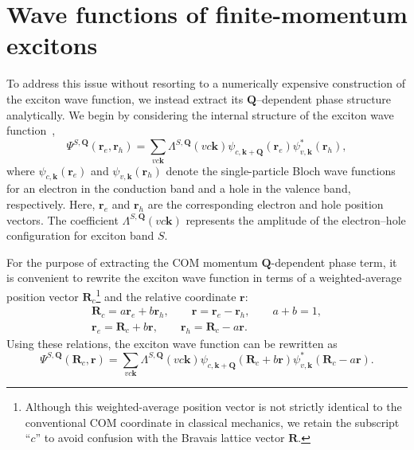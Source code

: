 %
%
%
%
%
%
\section{Wave functions of finite-momentum excitons}

To address this issue without resorting to a numerically expensive construction of the exciton wave function, we instead extract its $\boldsymbol{Q}$--dependent phase structure analytically. We begin by considering the internal structure of the exciton wave function~\cite{bajaj2025symmetries, haber2023maximally},
\begin{equation}
\Psi^{S,\boldsymbol{Q}}
(\boldsymbol{r}_e,\boldsymbol{r}_h)
=
\sum_{vc\boldsymbol{k}}
\Lambda^{S,\boldsymbol{Q}}(vc\boldsymbol{k})
\psi_{c,\boldsymbol{k}+\boldsymbol{Q}}(\boldsymbol{r}_e)
\psi^{*}_{v,\boldsymbol{k}}(\boldsymbol{r}_h),
\label{excitonWF1}
\end{equation}
where $\psi_{c,\boldsymbol{k}}(\boldsymbol{r}_e)$ and $\psi_{v,\boldsymbol{k}}(\boldsymbol{r}_h)$ denote the single-particle Bloch wave functions for an electron in the conduction band and a hole in the valence band, respectively. Here, $\boldsymbol{r}_e$ and $\boldsymbol{r}_h$ are the corresponding electron and hole position vectors. The coefficient $\Lambda^{S,\boldsymbol{Q}}(vc\boldsymbol{k})$ represents the amplitude of the electron--hole configuration for exciton band $S$. 

For the purpose of extracting the COM momentum $\boldsymbol{Q}$-dependent phase term, it is convenient to rewrite the exciton wave function in terms of a weighted-average position vector $\boldsymbol{R}_c$\footnote{Although this weighted-average position vector is not strictly identical to the conventional COM coordinate in classical mechanics, we retain the subscript ``$c$'' to avoid confusion with the Bravais lattice vector $\boldsymbol{R}$.} and the relative coordinate $\boldsymbol{r}$:
\begin{equation}
\begin{gathered}
\boldsymbol{R}_c = a\boldsymbol{r}_e + b\boldsymbol{r}_h,
\qquad
\boldsymbol{r} = \boldsymbol{r}_e - \boldsymbol{r}_h,
\qquad
a + b = 1,
\\
\boldsymbol{r}_e = \boldsymbol{R}_c + b\boldsymbol{r},
\qquad
\boldsymbol{r}_h = \boldsymbol{R}_c - a\boldsymbol{r}.
\end{gathered}
\end{equation}
Using these relations, the exciton wave function can be rewritten as
\begin{equation}
\Psi^{S,\boldsymbol{Q}}(\boldsymbol{R}_c,\boldsymbol{r})
=
\sum_{vc\boldsymbol{k}}
\Lambda^{S,\boldsymbol{Q}}(vc\boldsymbol{k})
\psi_{c,\boldsymbol{k}+\boldsymbol{Q}}(\boldsymbol{R}_c + b\boldsymbol{r})
\psi^{*}_{v,\boldsymbol{k}}(\boldsymbol{R}_c - a\boldsymbol{r}).
\label{excitonWF2}
\end{equation}

